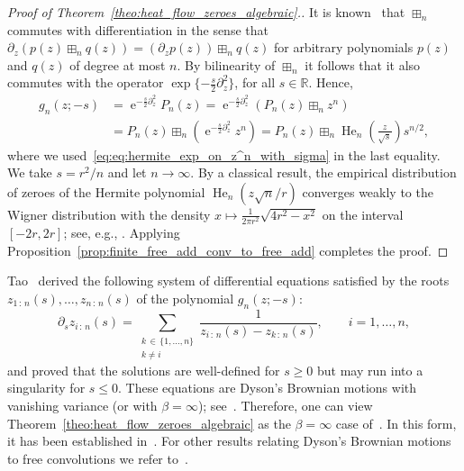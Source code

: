 \documentclass[AHL,Unicode,longabstracts,published]{cedram}
\DeclareMathOperator*{\He}{He}
\DeclareMathOperator{\eee}{e}
\newcommand{\R}{\mathbb{R}}
\begin{document}
\begin{proof}[Proof of Theorem~\ref{theo:heat_flow_zeroes_algebraic}.]
It is known~\cite{marcus_spielman_srivastava} that $\boxplus_n$ commutes with differentiation in the sense that $\partial_z (p(z) \boxplus_n q(z))= (\partial_z p(z)) \boxplus_n q(z)$ for arbitrary polynomials $p(z)$ and $q(z)$ of degree at most $n$. By bilinearity of $\boxplus_n$ it follows that it also commutes with the operator $\exp\{-\frac s2 \partial_z^2\}$, for all $s\in \R$. Hence,
\begin{align*}
g_{n} (z; -s) & =
\eee^{-\frac s2 \partial_z^2} P_{n}(z) =
\eee^{-\frac s2 \partial_z^2} \left(P_{n} (z) \boxplus_n z^n \right)\\
&= P_{n}(z)\boxplus_n \left(\eee^{-\frac s2 \partial_z^2} z^n\right) = P_n(z) \boxplus_n \He\nolimits_n\left(\frac{z}{\sqrt s}\right) s^{n/2},
\end{align*}
where we used~\eqref{eq:eq:hermite_exp_on_z^n_with_sigma} in the last equality. We take $s = r^2/ n$ and let $n\to\infty$. By a classical result, the empirical distribution of zeroes of the Hermite polynomial $\He_n(z\sqrt {n}/r)$ converges weakly to the Wigner distribution with the density $x\mapsto \frac 1 {2\pi r^2} \sqrt{4r^2-x^2}$ on the interval $[-2r,2r]$; see, e.g., \cite{gawronski,kornyik_michaletzky,ullman0}. Applying Proposition~\ref{prop:finite_free_add_conv_to_free_add} completes the proof.
\end{proof}


\begin{rema}
Tao~\cite{tao_blog1} derived the following system of differential equations satisfied by the roots $z_{1\,:\,n}(s),\ldots, z_{n\,:\,n}(s)$ of the polynomial $g_n(z; -s)$:
\begin{equation}\label{eq:dyson_without_noise}
\partial_s z_{i\,:\,n} (s) = \sum_{\substack{k\,\in\,\{1,\ldots, n\}\\ k\neq i}} \frac{1}{z_{i\,:\,n}(s) - z_{k\,:\,n}(s)},
\qquad i=1,\ldots, n,
\end{equation}
and proved that the solutions are well-defined for $s\geq 0$ but may run into a singularity for $s\leq 0$. These equations are Dyson's Brownian motions with vanishing variance (or with $\beta= \infty$); see~\cite[Theorem~4.3.2]{anderson_etal_book}. Therefore, one can view Theorem~\ref{theo:heat_flow_zeroes_algebraic} as the $\beta= \infty$ case of~\cite[Proposition~4.3.10]{anderson_etal_book}. In this form, it has been established in~\cite[Theorem~1.1]{voit_werner2}. For other results relating Dyson's Brownian motions to free convolutions we refer to~\cite{andraus2012,dumitriu_edelman_large_beta,gorin_kleptsyn,voit_woerner1,voit_werner2}.
\end{rema}
\end{document}
